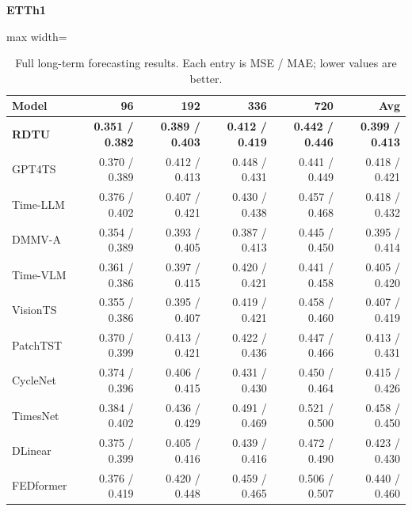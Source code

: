 \begin{table}[H]\centering\small
\caption{Full long-term forecasting results. Each entry is MSE / MAE; lower values are better.}\label{tab:long-term-forecasting-full}
\textbf{ETTh1}\par\smallskip
\begin{adjustbox}{max width=\linewidth}\begin{tabular}{lrrrrr}\toprule
\textbf{Model} & \textbf{96} & \textbf{192} & \textbf{336} & \textbf{720} & \textbf{Avg}\\\midrule
\rowcolor{blue!5}
\textbf{RDTU} & \textbf{0.351 / 0.382} & \textbf{0.389 / 0.403} & \textbf{0.412 / 0.419} & \textbf{0.442 / 0.446} & \textbf{0.399 / 0.413}\\
GPT4TS & 0.370 / 0.389 & 0.412 / 0.413 & 0.448 / 0.431 & 0.441 / 0.449 & 0.418 / 0.421\\
Time-LLM & 0.376 / 0.402 & 0.407 / 0.421 & 0.430 / 0.438 & 0.457 / 0.468 & 0.418 / 0.432\\
DMMV-A & 0.354 / 0.389 & 0.393 / 0.405 & 0.387 / 0.413 & 0.445 / 0.450 & 0.395 / 0.414\\
Time-VLM & 0.361 / 0.386 & 0.397 / 0.415 & 0.420 / 0.421 & 0.441 / 0.458 & 0.405 / 0.420\\
VisionTS & 0.355 / 0.386 & 0.395 / 0.407 & 0.419 / 0.421 & 0.458 / 0.460 & 0.407 / 0.419\\
PatchTST & 0.370 / 0.399 & 0.413 / 0.421 & 0.422 / 0.436 & 0.447 / 0.466 & 0.413 / 0.431\\
CycleNet & 0.374 / 0.396 & 0.406 / 0.415 & 0.431 / 0.430 & 0.450 / 0.464 & 0.415 / 0.426\\
TimesNet & 0.384 / 0.402 & 0.436 / 0.429 & 0.491 / 0.469 & 0.521 / 0.500 & 0.458 / 0.450\\
DLinear & 0.375 / 0.399 & 0.405 / 0.416 & 0.439 / 0.416 & 0.472 / 0.490 & 0.423 / 0.430\\
FEDformer & 0.376 / 0.419 & 0.420 / 0.448 & 0.459 / 0.465 & 0.506 / 0.507 & 0.440 / 0.460\\
\bottomrule\end{tabular}\end{adjustbox}\end{table}
